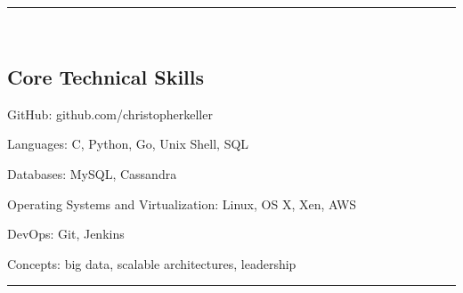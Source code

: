 

\hrule\
\vspace{-0.4em}
\subsection*{Core Technical Skills}
\begin{indentsection}{\parindent}
    \begin{description*}
        \item[GitHub:] github.com/christopherkeller
        \item[Languages:] C, Python, Go, Unix Shell, \textsc{SQL}
        \item[Databases:] My\textsc{SQL}, Cassandra
        \item[Operating Systems and Virtualization:] Linux, \textsc{OS X}, Xen, AWS
        \item[DevOps:] Git, Jenkins
        \item[Concepts:] big data, scalable architectures, leadership
	\end{description*}
\end{indentsection}
\hrule\
\vspace{-0.4em}
